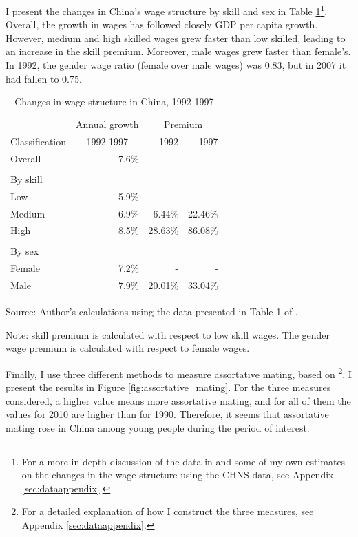 \documentclass[12pt]{article}
\newcommand{\source}[1]{\caption*{Source: {#1}} }
\newcommand{\note}[1]{\caption*{Note: {#1}} }
\begin{document}
I present the changes in China's wage structure by skill and sex in Table \ref{tab:wage_struct_ge_tao}\footnote{For a more in depth discussion of the data in \cite{getao14} and some of my own estimates on the changes in the wage structure using the CHNS data, see Appendix \ref{sec:dataappendix}.}. Overall, the growth in wages has followed closely GDP per capita growth. However, medium and high skilled wages grew faster than low skilled, leading to an increase in the skill premium. Moreover, male wages grew faster than female's. In 1992, the gender wage ratio (female over male wages) was 0.83, but in 2007 it had fallen to 0.75. 

\begin{table}[htbp]
	\centering
	\caption{Changes in wage structure in China, 1992-1997}
	\begin{tabular}{lrrr}
		\toprule
		& \multicolumn{1}{c}{Annual growth} & \multicolumn{2}{c}{Premium} \\
		\cmidrule{3-4}Classification & \multicolumn{1}{c}{1992-1997} & 1992  & 1997 \\
		\midrule
		Overall & 7.6\% &   -    & - \\
		&       &       &  \\
		By skill &       &       &  \\
		Low   & 5.9\% &   -    & - \\
		Medium & 6.9\% & 6.44\% & 22.46\% \\
		High  & 8.5\% & 28.63\% & 86.08\% \\
		&       &       &  \\
		By sex &       &       &  \\
		Female & 7.2\% &   -    & - \\
		Male  & 7.9\% & 20.01\% & 33.04\% \\
		\bottomrule
		\bottomrule
	\end{tabular}
	\label{tab:wage_struct_ge_tao}
	\source{Author's calculations using the data presented in Table 1 of \cite{getao14}.}
	\note{skill premium is calculated with respect to low skill wages. The gender wage premium is calculated with respect to female wages.}
\end{table}

Finally, I use three different methods to measure assortative mating, based on \cite{greenwoodetal14}\footnote{For a detailed explanation of how I construct the three measures, see Appendix \ref{sec:dataappendix}.}. I present the results in Figure \ref{fig:assortative_mating}. For the three measures considered, a higher value means more assortative mating, and for all of them the values for 2010 are higher than for 1990. Therefore, it seems that assortative mating rose in China among young people during the period of interest.
\end{document}
